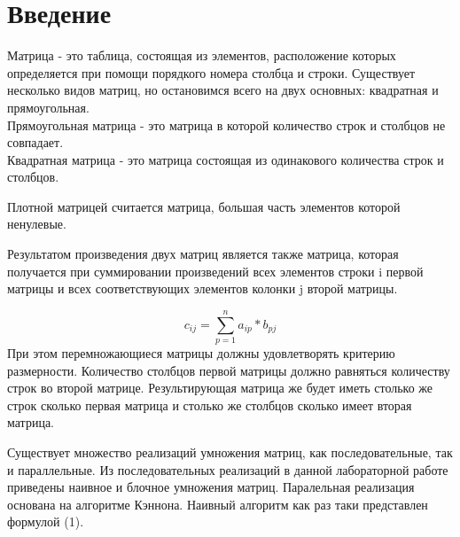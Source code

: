 \documentclass{report}
\begin{document}
\newpage

\section{\hspace{0.6cm}Введение}
Матрица - это таблица, состоящая из элементов, расположение которых определяется при помощи порядкого номера столбца и строки. Существует несколько видов матриц, но остановимся всего на двух основных: квадратная и прямоугольная.\\
Прямоугольная матрица - это матрица в которой количество строк и столбцов не совпадает.\\
Квадратная матрица - это матрица состоящая из одинакового количества строк и столбцов.
\par Плотной матрицей считается матрица, большая часть элементов которой ненулевые.
\par Результатом произведения двух матриц является также матрица, которая получается при суммировании произведений всех элементов строки i первой матрицы и всех соответствующих элементов колонки j второй матрицы.

\begin{equation}\label{eq:mult}
c_{ij} =  \sum \limits_{p=1}^{n} a_{ip} * b_{pj}
\end{equation}
При этом перемножающиеся матрицы должны удовлетворять критерию размерности. Количество столбцов первой матрицы должно равняться количеству строк во второй матрице. Результирующая матрица же будет иметь столько же строк сколько первая матрица и столько же столбцов сколько имеет вторая матрица.
\par Существует множество реализаций умножения матриц, как последовательные, так и параллельные. Из последовательных реализаций в данной лабораторной работе приведены наивное и блочное умножения матриц. Паралельная реализация основана на алгоритме Кэннона. Наивный алгоритм как раз таки представлен формулой (1).
\newpage
\end{document}

